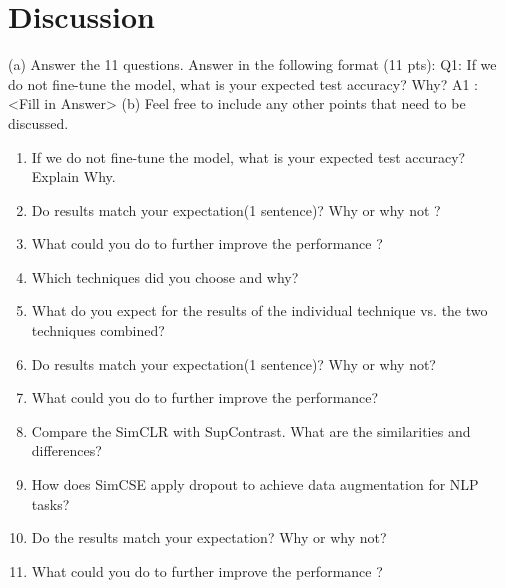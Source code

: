 \section*{Discussion}

(a) Answer the 11 questions. Answer in the following format (11 pts):
Q1: If we do not fine-tune the model, what is your expected test accuracy? Why? A1 : <Fill in Answer>
(b) Feel free to include any other points that need to be discussed.
\begin{enumerate}
  \item If we do not fine-tune the model, what is your expected test accuracy? Explain Why.
  \item Do results match your expectation(1 sentence)? Why or why not ? 
  \item What could you do to further improve the performance ?
  \item Which techniques did you choose and why?
  \item What do you expect for the results of the individual technique vs. the two techniques combined?
  \item Do results match your expectation(1 sentence)? Why or why not?
  \item What could you do to further improve the performance?
  \item Compare the SimCLR with SupContrast. What are the similarities and differences?
  \item How does SimCSE apply dropout to achieve data augmentation for NLP tasks?
  \item Do the results match your expectation? Why or why not? 
  \item What could you do to further improve the performance ?
\end{enumerate}
